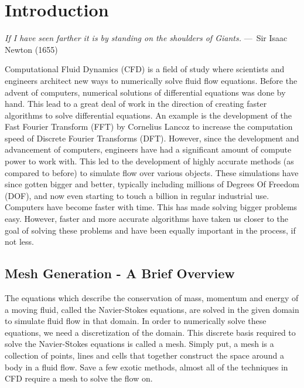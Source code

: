 
\chapter{Introduction}
\label{ch:Introduction}

\begin{epigraph}
    \emph{If I have seen farther it is by standing on the shoulders of
    Giants.} ---~Sir Isaac Newton (1655)
\end{epigraph}

Computational Fluid Dynamics (CFD) is a field of study where scientists and engineers architect new ways to numerically solve fluid flow equations. Before the advent of computers, numerical solutions of differential equations was done by hand. This lead to a great deal of work in the direction of creating faster algorithms to solve differential equations. An example is the development of the Fast Fourier Transform (FFT) by Cornelius Lancoz to increase the computation speed of Discrete Fourier Transforms (DFT). However, since the development and advancement of computers, engineers have had a significant amount of compute power to work with. This led to the development of highly accurate methods (as compared to before) to simulate flow over various objects. These simulations have since gotten bigger and better, typically including millions of Degrees Of Freedom (DOF), and now even starting to touch a billion in regular industrial use. Computers have become faster with time. This has made solving bigger problems easy. However, faster and more accurate algorithms have taken us closer to the goal of solving these problems and have been equally important in the process, if not less.

\section{Mesh Generation - A Brief Overview}

The equations which describe the conservation of mass, momentum and energy of a moving fluid, called the Navier-Stokes equations, are solved in the given domain to simulate fluid flow in that domain. In order to numerically solve these equations, we need a discretization of the domain. This discrete basis required to solve the Navier-Stokes equations is called a mesh. Simply put, a mesh is a collection of points, lines and cells that together construct the space around a body in a fluid flow. Save a few exotic methods, almost all of the techniques in CFD require a mesh to solve the flow on.

